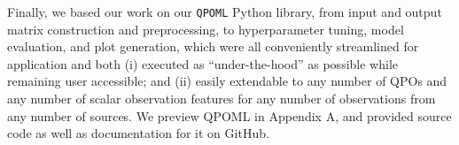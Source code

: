 \documentclass[fleqn,usenatbib,twocolumn]{mnras}%
\begin{document}
Finally, we based our work on our \texttt{QPOML} Python library, from input and output matrix construction and preprocessing, to hyperparameter tuning, model evaluation, and plot generation, which were all conveniently streamlined for application and both (i) executed as ``under-the-hood'' as possible while remaining user accessible; and (ii) easily extendable to any number of QPOs and any number of scalar observation features for any number of observations from any number of sources. We preview QPOML in Appendix A, and provided source code as well as documentation for it on GitHub. 

\end{document}
